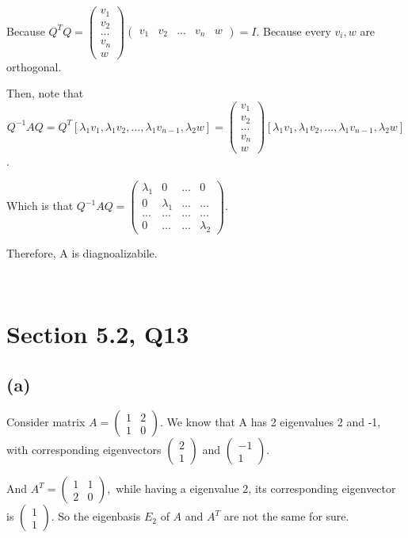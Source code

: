 \documentclass[12pt]{article}%
\begin{document}
Because $Q^{T}Q=\begin{pmatrix}v_1 \\ v_2 \\ ... \\ v_n \\ w\end{pmatrix} \begin{pmatrix}v_1 & v_2 & ... & v_n & w\end{pmatrix}= I.$ Because every $v_i,w$ are orthogonal.

Then, note that $$Q^{-1}AQ=Q^{T}[\lambda_1 v_1,\lambda_1 v_2,...,\lambda_1 v_{n-1}, \lambda_2 w ]=\begin{pmatrix}v_1 \\ v_2 \\ ... \\ v_n \\ w\end{pmatrix} [\lambda_1 v_1,\lambda_1 v_2,...,\lambda_1 v_{n-1}, \lambda_2 w ]$$.

Which is that $Q^{-1}AQ=\begin{pmatrix} \lambda_1&0&...&0\\0&\lambda_1&...&...\\...&...&...&...\\0&...&...&\lambda_2 \end{pmatrix}.$

Therefore, A is diagnoalizabile.


~\ 


\section{Section 5.2, Q13}
\subsection{(a)}
Consider matrix $A =\begin{pmatrix}1&2\\1&0\end{pmatrix}.$ We know that A has 2 eigenvalues 2 and -1, with corresponding eigenvectors $\begin{pmatrix} 2\\ 1\end{pmatrix}$ and $\begin{pmatrix} -1\\1\end{pmatrix}.$

And $A^{T}=\begin{pmatrix}1&1\\2&0\end{pmatrix},$ while having a eigenvalue 2, its corresponding eigenvector is $\begin{pmatrix} 1\\ 1\end{pmatrix}.$ So the eigenbasis $E_2$ of $A$ and $A^{T}$ are not the same for sure.
\end{document}
